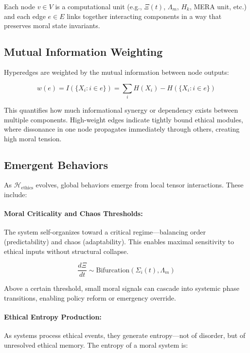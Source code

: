 \documentclass{article}
\theoremstyle{plain}
\theoremstyle{claimstyle}
\begin{document}
Each node \(v \in V\) is a computational unit (e.g., \(\Xi(t)\), \(\Lambda_m\), \(H_k\), MERA unit, etc.) and each edge \(e \in E\) links together interacting components in a way that preserves moral state invariants.

\subsection{Mutual Information Weighting}

Hyperedges are weighted by the mutual information between node outputs:

\[
w(e) = I(\{X_i : i \in e\}) = \sum_{i} H(X_i) - H(\{X_i : i \in e\})
\]

This quantifies how much informational synergy or dependency exists between multiple components. High-weight edges indicate tightly bound ethical modules, where dissonance in one node propagates immediately through others, creating high moral tension.

\subsection{Emergent Behaviors}

As \(\mathcal{H}_{\text{ethics}}\) evolves, global behaviors emerge from local tensor interactions. These include:

\paragraph{Moral Criticality and Chaos Thresholds:}

The system self-organizes toward a critical regime—balancing order (predictability) and chaos (adaptability). This enables maximal sensitivity to ethical inputs without structural collapse.

\[
\frac{d\Xi}{dt} \sim \text{Bifurcation}(\Sigma_i(t), \Lambda_m)
\]

Above a certain threshold, small moral signals can cascade into systemic phase transitions, enabling policy reform or emergency override.

\paragraph{Ethical Entropy Production:}

As systems process ethical events, they generate entropy—not of disorder, but of unresolved ethical memory. The entropy of a moral system is:
\end{document}
